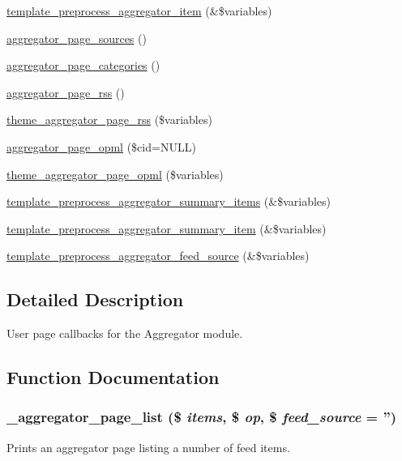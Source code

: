 \begin{DoxyCompactItemize}
\hyperlink{aggregator_8pages_8inc_a98e977c5fd28c4e808be5786a3f9e805}{template\_\-preprocess\_\-aggregator\_\-item} (\&\$variables)
\item 
\hyperlink{aggregator_8pages_8inc_ad0ef3a50612adec65e464214ce643bf6}{aggregator\_\-page\_\-sources} ()
\item 
\hyperlink{aggregator_8pages_8inc_a180a110c19ebe4eeaacaa61aff7b42e5}{aggregator\_\-page\_\-categories} ()
\item 
\hyperlink{aggregator_8pages_8inc_a94deaf11e3e859a3c338a74191120a37}{aggregator\_\-page\_\-rss} ()
\item 
\hyperlink{group__themeable_ga458bff845ec41963f5acb8a81561ef98}{theme\_\-aggregator\_\-page\_\-rss} (\$variables)
\item 
\hyperlink{aggregator_8pages_8inc_a8d85211ae223530fc56bad7caf9a9b5d}{aggregator\_\-page\_\-opml} (\$cid=NULL)
\item 
\hyperlink{group__themeable_ga1faa7b7c87cd772cb1005e83bb331616}{theme\_\-aggregator\_\-page\_\-opml} (\$variables)
\item 
\hyperlink{aggregator_8pages_8inc_af80643fa6f8b742a431aed61576606dd}{template\_\-preprocess\_\-aggregator\_\-summary\_\-items} (\&\$variables)
\item 
\hyperlink{aggregator_8pages_8inc_ab60386a469193731ad719534bcdcac56}{template\_\-preprocess\_\-aggregator\_\-summary\_\-item} (\&\$variables)
\item 
\hyperlink{aggregator_8pages_8inc_a06bc89c22bcd3b3c70c9c1d19391aefc}{template\_\-preprocess\_\-aggregator\_\-feed\_\-source} (\&\$variables)
\end{DoxyCompactItemize}


\subsection{Detailed Description}
User page callbacks for the Aggregator module. 

\subsection{Function Documentation}
\hypertarget{aggregator_8pages_8inc_a825e07217628ea623b6392c5a38d94f6}{
\subsubsection[{\_\-aggregator\_\-page\_\-list}]{\setlength{\rightskip}{0pt plus 5cm}\_\-aggregator\_\-page\_\-list (\$ {\em items}, \/  \$ {\em op}, \/  \$ {\em feed\_\-source} = {\ttfamily ''})}}
\label{aggregator_8pages_8inc_a825e07217628ea623b6392c5a38d94f6}
Prints an aggregator page listing a number of feed items.

